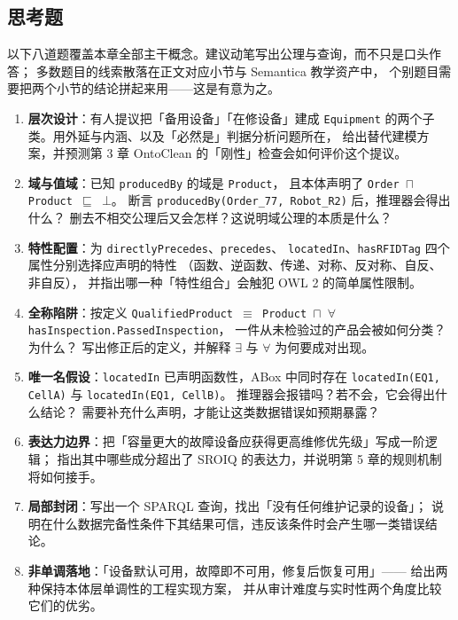 \subsection{思考题}

以下八道题覆盖本章全部主干概念。建议动笔写出公理与查询，而不只是口头作答；
多数题目的线索散落在正文对应小节与 Semantica 教学资产中，
个别题目需要把两个小节的结论拼起来用——这是有意为之。

\begin{noteblock}
\begin{enumerate}
\item \textbf{层次设计}：有人提议把「备用设备」「在修设备」建成
      \texttt{Equipment} 的两个子类。用外延与内涵、以及「必然是」判据分析问题所在，
      给出替代建模方案，并预测第 3 章 OntoClean 的「刚性」检查会如何评价这个提议。
\item \textbf{域与值域}：已知 \texttt{producedBy} 的域是 \texttt{Product}，
      且本体声明了 \texttt{Order \(\sqcap\) Product \(\sqsubseteq\) \(\bot\)}。
      断言 \texttt{producedBy(Order\_77, Robot\_R2)} 后，推理器会得出什么？
      删去不相交公理后又会怎样？这说明域公理的本质是什么？
\item \textbf{特性配置}：为 \texttt{directlyPrecedes}、\texttt{precedes}、
      \texttt{locatedIn}、\texttt{hasRFIDTag} 四个属性分别选择应声明的特性
      （函数、逆函数、传递、对称、反对称、自反、非自反），
      并指出哪一种「特性组合」会触犯 OWL 2 的简单属性限制。
\item \textbf{全称陷阱}：按定义
      \texttt{QualifiedProduct \(\equiv\) Product \(\sqcap\)
      \(\forall\)hasInspection.PassedInspection}，
      一件从未检验过的产品会被如何分类？为什么？
      写出修正后的定义，并解释 \(\exists\) 与 \(\forall\) 为何要成对出现。
\item \textbf{唯一名假设}：\texttt{locatedIn} 已声明函数性，ABox 中同时存在
      \texttt{locatedIn(EQ1, CellA)} 与 \texttt{locatedIn(EQ1, CellB)}。
      推理器会报错吗？若不会，它会得出什么结论？
      需要补充什么声明，才能让这类数据错误如预期暴露？
\item \textbf{表达力边界}：把「容量更大的故障设备应获得更高维修优先级」写成一阶逻辑；
      指出其中哪些成分超出了 SROIQ 的表达力，并说明第 5 章的规则机制将如何接手。
\item \textbf{局部封闭}：写出一个 SPARQL 查询，找出「没有任何维护记录的设备」；
      说明在什么数据完备性条件下其结果可信，违反该条件时会产生哪一类错误结论。
\item \textbf{非单调落地}：「设备默认可用，故障即不可用，修复后恢复可用」——
      给出两种保持本体层单调性的工程实现方案，
      并从审计难度与实时性两个角度比较它们的优劣。
\end{enumerate}
\end{noteblock}

